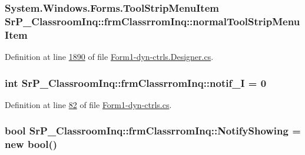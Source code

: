 \hypertarget{class_sr_p___classroom_inq_1_1frm_classrrom_inq_a19933124599a8ff87bd0d7fd10808c4e}{
\subsubsection[{normal\-Tool\-Strip\-Menu\-Item}]{\setlength{\rightskip}{0pt plus 5cm}\-System.\-Windows.\-Forms.\-Tool\-Strip\-Menu\-Item {\bf \-Sr\-P\-\_\-\-Classroom\-Inq\-::frm\-Classrrom\-Inq\-::normal\-Tool\-Strip\-Menu\-Item}}}
\label{class_sr_p___classroom_inq_1_1frm_classrrom_inq_a19933124599a8ff87bd0d7fd10808c4e}


\-Definition at line \hyperlink{_form1-dyn-ctrls_8_designer_8cs_source_l01890}{1890} of file \hyperlink{_form1-dyn-ctrls_8_designer_8cs_source}{\-Form1-\/dyn-\/ctrls.\-Designer.\-cs}.

\hypertarget{class_sr_p___classroom_inq_1_1frm_classrrom_inq_a55f84efe1ba2cfb49d836798a1db3477}{
\subsubsection[{notif\-\_\-\-I}]{\setlength{\rightskip}{0pt plus 5cm}int {\bf \-Sr\-P\-\_\-\-Classroom\-Inq\-::frm\-Classrrom\-Inq\-::notif\-\_\-\-I} = 0}}
\label{class_sr_p___classroom_inq_1_1frm_classrrom_inq_a55f84efe1ba2cfb49d836798a1db3477}


\-Definition at line \hyperlink{_form1-dyn-ctrls_8cs_source_l00082}{82} of file \hyperlink{_form1-dyn-ctrls_8cs_source}{\-Form1-\/dyn-\/ctrls.\-cs}.

\hypertarget{class_sr_p___classroom_inq_1_1frm_classrrom_inq_a13f540b89ba154a7b133ae266eeb18aa}{
\subsubsection[{\-Notify\-Showing}]{\setlength{\rightskip}{0pt plus 5cm}bool {\bf \-Sr\-P\-\_\-\-Classroom\-Inq\-::frm\-Classrrom\-Inq\-::\-Notify\-Showing} = new bool()}}
\label{class_sr_p___classroom_inq_1_1frm_classrrom_inq_a13f540b89ba154a7b133ae266eeb18aa}


